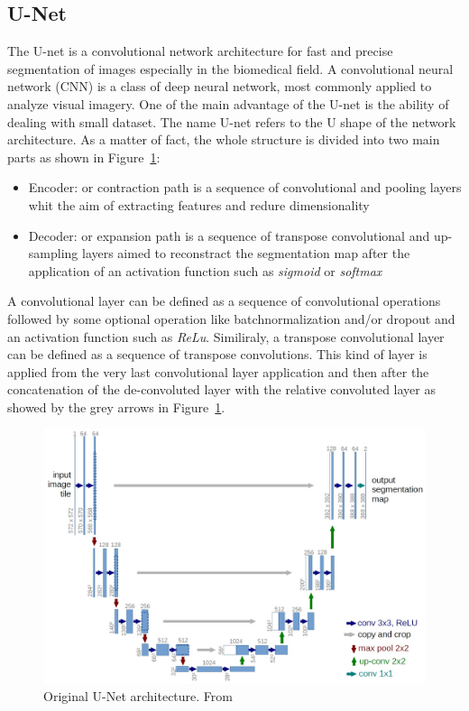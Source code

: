 \documentclass[12pt,a4paper]{report}
\begin{document}
\subsection{U-Net}

The U-net is a convolutional network architecture for fast and precise segmentation of images especially in the biomedical field\cite{unet}.
A convolutional neural network (CNN) is a class of deep neural network, most commonly applied to analyze visual imagery\cite{wiki:cnn}. One of the main advantage of the U-net is the ability of dealing with small dataset. The name U-net refers to the U shape of the network architecture. As a matter of fact, the whole structure is divided into two main parts as shown in Figure~\ref{unet}:
\begin{itemize}[label=\textbf{*}]
    \item Encoder: or contraction path is a sequence of convolutional and pooling layers whit the aim of extracting features and redure dimensionality
    \item Decoder: or expansion path is a sequence of transpose convolutional and up-sampling layers aimed to reconstract the segmentation map after the application of an activation function such as \textit{sigmoid} or \textit{softmax}
\end{itemize}
 A convolutional layer can be defined as a sequence of convolutional operations followed by some optional operation like batchnormalization and/or dropout and an activation function such as \textit{ReLu}. Similiraly, a transpose convolutional layer can be defined as a sequence of transpose convolutions. This kind of layer is applied from the very last convolutional layer application and then after the concatenation of the de-convoluted layer with the relative convoluted layer as showed by the grey arrows in Figure~\ref{unet}.


\begin{figure}[h!]
	\centering
	\includegraphics[width=0.8\linewidth]{images/U-Net arch.jpeg}
	\caption{Original U-Net architecture. From \cite{unet} }\label{unet}
\end{figure}
\end{document}
